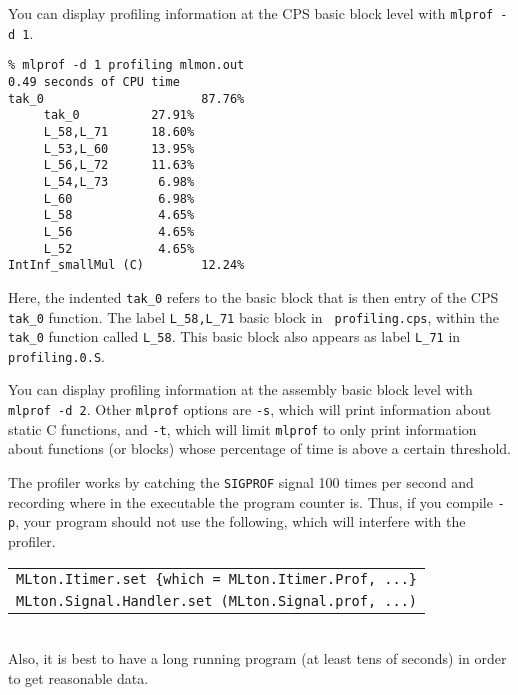 You can display profiling information at the CPS basic block level with
{\tt mlprof -d 1}.

\begin{verbatim}
% mlprof -d 1 profiling mlmon.out
0.49 seconds of CPU time
tak_0                      87.76%
     tak_0          27.91%       
     L_58,L_71      18.60%       
     L_53,L_60      13.95%       
     L_56,L_72      11.63%       
     L_54,L_73       6.98%       
     L_60            6.98%       
     L_58            4.65%       
     L_56            4.65%       
     L_52            4.65%       
IntInf_smallMul (C)        12.24%
\end{verbatim}
Here, the indented {\tt tak\_0} refers to the basic block that is then entry of
the CPS {\tt tak\_0} function.  The label {\tt L\_58,L\_71} basic block in {\tt
profiling.cps}, within the {\tt tak\_0} function called {\tt L\_58}.  This basic
block also appears as label {\tt L\_71} in {\tt profiling.0.S}.

You can display profiling information at the assembly basic block level with
{\tt mlprof -d 2}.  Other {\tt mlprof} options are
{\tt -s}, which will print information about static C functions, and {\tt -t},
which will limit {\tt mlprof} to only print information about functions (or
blocks) whose percentage of time is above a certain threshold.

The profiler works by catching the {\tt SIGPROF} signal 100 times per second and
recording where in the executable the program counter is.  Thus, if you compile
{\tt -p}, your program should not use the following, which will interfere with
the profiler.\\
\begin{tabular}{l}
\tt MLton.Itimer.set \{which = MLton.Itimer.Prof, ...\}\\
\tt MLton.Signal.Handler.set (MLton.Signal.prof, ...)
\end{tabular}\\
Also, it is best to have a long running program (at least tens of seconds) in
order to get reasonable data. 

